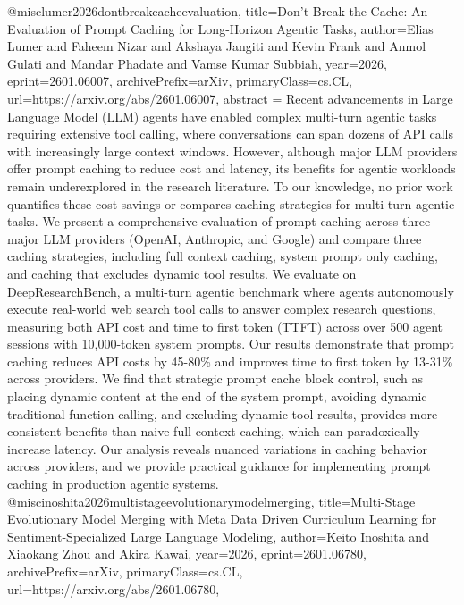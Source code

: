 {}@misc{lumer2026dontbreakcacheevaluation,
      title={Don't Break the Cache: An Evaluation of Prompt Caching for Long-Horizon Agentic Tasks}, 
      author={Elias Lumer and Faheem Nizar and Akshaya Jangiti and Kevin Frank and Anmol Gulati and Mandar Phadate and Vamse Kumar Subbiah},
      year={2026},
      eprint={2601.06007},
      archivePrefix={arXiv},
      primaryClass={cs.CL},
      url={https://arxiv.org/abs/2601.06007},
      abstract = {Recent advancements in Large Language Model (LLM) agents have enabled complex multi-turn agentic tasks requiring extensive tool calling, where conversations can span dozens of API calls with increasingly large context windows. However, although major LLM providers offer prompt caching to reduce cost and latency, its benefits for agentic workloads remain underexplored in the research literature. To our knowledge, no prior work quantifies these cost savings or compares caching strategies for multi-turn agentic tasks. We present a comprehensive evaluation of prompt caching across three major LLM providers (OpenAI, Anthropic, and Google) and compare three caching strategies, including full context caching, system prompt only caching, and caching that excludes dynamic tool results. We evaluate on DeepResearchBench, a multi-turn agentic benchmark where agents autonomously execute real-world web search tool calls to answer complex research questions, measuring both API cost and time to first token (TTFT) across over 500 agent sessions with 10,000-token system prompts. Our results demonstrate that prompt caching reduces API costs by 45-80\% and improves time to first token by 13-31\% across providers. We find that strategic prompt cache block control, such as placing dynamic content at the end of the system prompt, avoiding dynamic traditional function calling, and excluding dynamic tool results, provides more consistent benefits than naive full-context caching, which can paradoxically increase latency. Our analysis reveals nuanced variations in caching behavior across providers, and we provide practical guidance for implementing prompt caching in production agentic systems.}
}@misc{inoshita2026multistageevolutionarymodelmerging,
      title={Multi-Stage Evolutionary Model Merging with Meta Data Driven Curriculum Learning for Sentiment-Specialized Large Language Modeling}, 
      author={Keito Inoshita and Xiaokang Zhou and Akira Kawai},
      year={2026},
      eprint={2601.06780},
      archivePrefix={arXiv},
      primaryClass={cs.CL},
      url={https://arxiv.org/abs/2601.06780},
}
